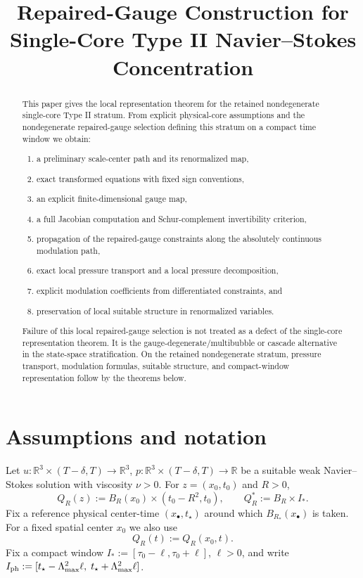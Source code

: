 \documentclass[11pt]{amsart}
\title[Repaired-Gauge Construction for Single-Core Type II]
{Repaired-Gauge Construction for Single-Core Type II Navier--Stokes Concentration}
\author{}
\date{}
\theoremstyle{plain}
\theoremstyle{definition}
\theoremstyle{remark}
\newcommand{\RR}{\mathbb R}
\begin{document}
\begin{abstract}
This paper gives the local representation theorem for the retained
nondegenerate single-core Type II stratum.  From explicit physical-core
assumptions and the nondegenerate repaired-gauge selection defining this stratum
on a compact time window we obtain:
\begin{enumerate}
\item a preliminary scale-center path and its renormalized map,
\item exact transformed equations with fixed sign conventions,
\item an explicit finite-dimensional gauge map,
\item a full Jacobian computation and Schur-complement invertibility criterion,
\item propagation of the repaired-gauge constraints along the
  absolutely continuous modulation path,
\item exact local pressure transport and a local pressure decomposition,
\item explicit modulation coefficients from differentiated constraints, and
\item preservation of local suitable structure in renormalized variables.
\end{enumerate}
Failure of this local repaired-gauge selection is not treated as a defect of the
single-core representation theorem. It is the gauge-degenerate/multibubble or
cascade alternative in the state-space stratification. On the retained
nondegenerate stratum, pressure transport, modulation formulas, suitable
structure, and compact-window representation follow by the theorems below.
\end{abstract}
\maketitle

\section{Assumptions and notation}\label{sec:assumptions}

Let \(u:\RR^{3}\times (T-\delta,T)\to \RR^{3}\), \(p:\RR^{3}\times (T-\delta,T)\to\RR\)
be a suitable weak Navier--Stokes solution with viscosity \(\nu>0\).
For \(z=(x_0,t_0)\) and \(R>0\),
\[
Q_R(z):=B_R(x_0)\times (t_0-R^2,t_0),\qquad
Q_R^*:=B_R\times I_*.
\]
Fix a reference physical center-time \((x_\bullet,t_\star)\) around which \(B_{R_*}(x_\bullet)\) is taken.
For a fixed spatial center \(x_0\) we also use
\[
Q_R(t):=Q_R(x_0,t).
\]
Fix a compact window \(I_*:=[\tau_0-\ell,\tau_0+\ell]\), \(\ell>0\), and write
\(I_{\rm ph}:=[t_\star-\Lambda_{\max}^2\ell,\; t_\star+\Lambda_{\max}^2\ell]\).
\end{document}
